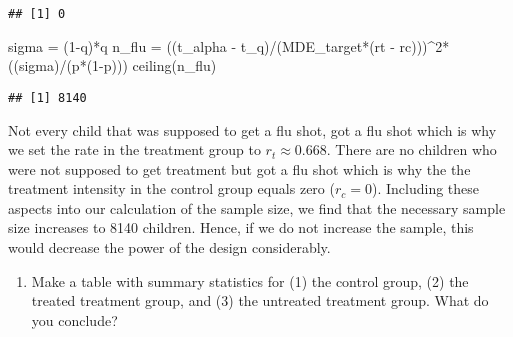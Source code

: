 \documentclass[
]{article}
\newenvironment{Shaded}{\begin{snugshade}}{\end{snugshade}}
\newcommand{\DecValTok}[1]{\textcolor[rgb]{0.00,0.00,0.81}{#1}}
\newcommand{\FunctionTok}[1]{\textcolor[rgb]{0.00,0.00,0.00}{#1}}
\newcommand{\NormalTok}[1]{#1}
\newcommand{\OtherTok}[1]{\textcolor[rgb]{0.56,0.35,0.01}{#1}}
\newcommand{\SpecialCharTok}[1]{\textcolor[rgb]{0.00,0.00,0.00}{#1}}
\providecommand{\tightlist}{%
  \setlength{\itemsep}{0pt}\setlength{\parskip}{0pt}}
\begin{document}
\begin{verbatim}
## [1] 0
\end{verbatim}

\begin{Shaded}
\begin{Highlighting}[]
\NormalTok{sigma }\OtherTok{=}\NormalTok{ (}\DecValTok{1}\SpecialCharTok{{-}}\NormalTok{q)}\SpecialCharTok{*}\NormalTok{q}
\NormalTok{n\_flu }\OtherTok{=}\NormalTok{ ((t\_alpha }\SpecialCharTok{{-}}\NormalTok{ t\_q)}\SpecialCharTok{/}\NormalTok{(MDE\_target}\SpecialCharTok{*}\NormalTok{(rt }\SpecialCharTok{{-}}\NormalTok{ rc)))}\SpecialCharTok{\^{}}\DecValTok{2}\SpecialCharTok{*}\NormalTok{((sigma)}\SpecialCharTok{/}\NormalTok{(p}\SpecialCharTok{*}\NormalTok{(}\DecValTok{1}\SpecialCharTok{{-}}\NormalTok{p)))}
\FunctionTok{ceiling}\NormalTok{(n\_flu)}
\end{Highlighting}
\end{Shaded}

\begin{verbatim}
## [1] 8140
\end{verbatim}

Not every child that was supposed to get a flu shot, got a flu shot
which is why we set the rate in the treatment group to
\(r_t \approx 0.668\). There are no children who were not supposed to
get treatment but got a flu shot which is why the the treatment
intensity in the control group equals zero (\(r_c = 0\)). Including
these aspects into our calculation of the sample size, we find that the
necessary sample size increases to 8140 children. Hence, if we do not
increase the sample, this would decrease the power of the design
considerably.

\begin{enumerate}
\def\labelenumi{\alph{enumi})}
\setcounter{enumi}{2}
\tightlist
\item
  Make a table with summary statistics for (1) the control group, (2)
  the treated treatment group, and (3) the untreated treatment group.
  What do you conclude?
\end{enumerate}
\end{document}
